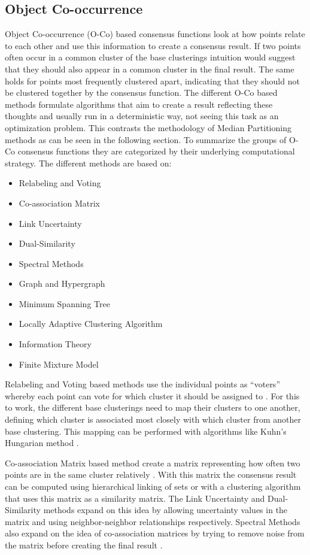 \documentclass[
	a4paper,
	english,
	twoside,
	openright,               
	11pt                            
	]{report}
\begin{document}
\subsection{Object Co-occurrence}
Object Co-occurrence (O-Co) based consensus functions look at how points relate to each other and use this information to create a consensus result. If two points often occur in a common cluster of the base clusterings intuition would suggest that they should also appear in a common cluster in the final result. The same holds for points most frequently clustered apart, indicating that they should not be clustered together by the consensus function. The different O-Co based methods formulate algorithms that aim to create a result reflecting these thoughts and usually run in a deterministic way, not seeing this task as an optimization problem. This contrasts the methodology of Median Partitioning methods as can be seen in the following section. To summarize the groups of O-Co consensus functions they are categorized by their underlying computational strategy. The different methods are based on:

\begin{itemize}
  \item Relabeling and Voting
  \item Co-association Matrix
  \item Link Uncertainty
  \item Dual-Similarity
  \item Spectral Methods
  \item Graph and Hypergraph
  \item Minimum Spanning Tree
  \item Locally Adaptive Clustering Algorithm
  \item Information Theory
  \item Finite Mixture Model
\end{itemize}

Relabeling and Voting based methods use the individual points as  ``voters'' whereby each point can vote for which cluster it should be assigned to \cite{4470298}. For this to work, the different base clusterings need to map their clusters to one another, defining which cluster is associated most closely with which cluster from another base clustering. This mapping can be performed with algorithms like Kuhn’s Hungarian method \cite{Kuhn2010}.

Co-association Matrix based method create a matrix representing how often two points are in the same cluster relatively  \cite{Monti2003}. With this matrix the consensus result can be computed using hierarchical linking of sets or with a clustering algorithm that uses this matrix as a similarity matrix. The Link Uncertainty \cite{6413733} and Dual-Similarity \cite{7344797} methods expand on this idea by allowing uncertainty values in the matrix and using neighbor-neighbor relationships respectively. Spectral Methods also expand on the idea of co-association matrices by trying to remove noise from the matrix before creating the final result \cite{Tao:2016:RSE:2983323.2983745}.
\end{document}
